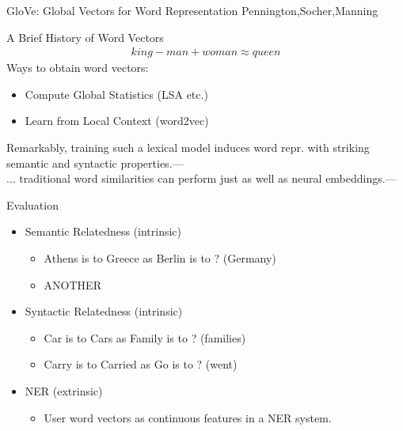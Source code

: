 \begin{frame}
  \begin{center}
    {\huge GloVe: Global Vectors for Word Representation
    }
    Pennington,Socher,Manning
  \end{center}
\end{frame}

\begin{frame}{A Brief History of Word Vectors}
  \begin{align*}
    king - man + woman \approx queen
  \end{align*}
  Ways to obtain word vectors:
  \begin{itemize}
  \item Compute Global Statistics (LSA etc.)
  \item Learn from Local Context (word2vec)
  \end{itemize}
  \footnotesize{Remarkably, training such a lexical model induces word repr. with striking semantic and syntactic properties.}---\cite{Mikolov13a} \\
  \footnotesize{... traditional word similarities can perform just as well as neural embeddings.}---\cite{Levy14}
\end{frame}

\begin{frame}{Evaluation}
  \begin{itemize}
  \item Semantic Relatedness (intrinsic)
    \begin{itemize}
    \item Athens is to Greece as Berlin is to ? (Germany)
    \item ANOTHER
    \end{itemize}
  \item Syntactic Relatedness (intrinsic)
    \begin{itemize}
    \item Car is to Cars as Family is to ? (families)
    \item Carry is to Carried as Go is to ? (went)
    \end{itemize}
  \item NER (extrinsic)
    \begin{itemize}
    \item User word vectors as continuous features in a NER system.
    \end{itemize}
  \end{itemize}
\end{frame}

